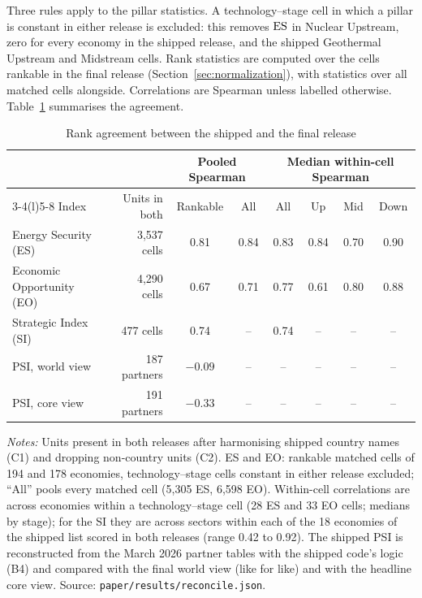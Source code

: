 

Three rules apply to the pillar statistics. A technology--stage cell in which a pillar is constant
in either release is excluded: this removes $\mathrm{ES}$ in Nuclear Upstream, zero for every economy in the
shipped release, and the shipped Geothermal Upstream and Midstream cells. Rank statistics are
computed over the cells rankable in the final release (Section~\ref{sec:normalization}), with
statistics over all matched cells alongside. Correlations are Spearman unless labelled otherwise.
Table~\ref{tab:corrections_reconciliation} summarises the agreement.

\begin{table}[htbp]
  \centering
  \begin{threeparttable}
  \caption{Rank agreement between the shipped and the final release}
  \label{tab:corrections_reconciliation}
  \small
  \begin{tabular}{@{}l r c c c c c c@{}}
    \toprule
    & & \multicolumn{2}{c}{Pooled Spearman} & \multicolumn{4}{c}{Median within-cell Spearman} \\
    \cmidrule(lr){3-4}\cmidrule(l){5-8}
    Index & Units in both & Rankable & All & All & Up & Mid & Down \\
    \midrule
    Energy Security (ES) & 3{,}537 cells & 0.81 & 0.84 & 0.83 & 0.84 & 0.70 & 0.90 \\
    Economic Opportunity (EO) & 4{,}290 cells & 0.67 & 0.71 & 0.77 & 0.61 & 0.80 & 0.88 \\
    Strategic Index (SI) & 477 cells & 0.74 & -- & 0.74 & -- & -- & -- \\
    PSI, world view & 187 partners & $-0.09$ & -- & -- & -- & -- & -- \\
    PSI, core view & 191 partners & $-0.33$ & -- & -- & -- & -- & -- \\
    \bottomrule
  \end{tabular}
  \begin{tablenotes}[flushleft]\footnotesize
    \item \emph{Notes:} Units present in both releases after harmonising shipped country names (C1)
    and dropping non-country units (C2). ES and EO: rankable matched cells of 194 and 178 economies,
    technology--stage cells constant in either release excluded; ``All'' pools every matched cell
    (5{,}305 ES, 6{,}598 EO). Within-cell correlations are across economies within a
    technology--stage cell (28 ES and 33 EO cells; medians by stage); for the SI they are across sectors
    within each of the 18 economies of the shipped list scored in both releases (range 0.42 to 0.92).
    The shipped PSI is reconstructed from the March 2026 partner tables with the shipped code's logic
    (B4) and compared with the final world view (like for like) and with the headline core view.
    Source: \texttt{paper/results/reconcile.json}.
  \end{tablenotes}
  \end{threeparttable}
\end{table}

